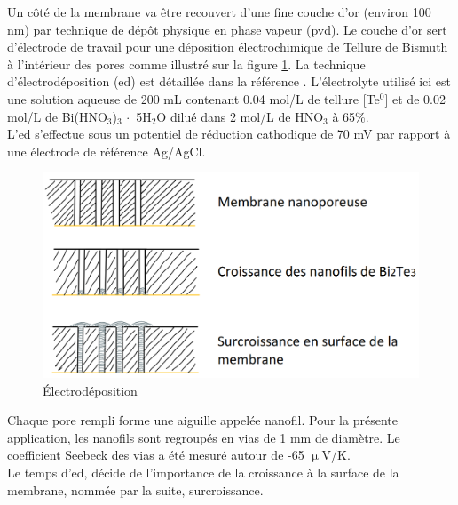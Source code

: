 Un côté de la membrane va être recouvert d'une fine couche d'or (environ 100 nm) par technique de dépôt physique en phase vapeur (\gls{pvd}). 
Le couche d'or sert d'électrode de travail pour une déposition électrochimique de Tellure de Bismuth à l'intérieur des pores comme illustré sur 
la figure \ref{fig:electrodeposition}. La technique d'électrodéposition (\gls{ed}) est détaillée dans la référence \cite{gravier_low-cost_2021}. 
L'électrolyte utilisé ici est une solution aqueuse de 200 mL contenant 0.04 mol/L de tellure [Te$^0$] et de 0.02 mol/L de 
Bi(HNO$_3$)$_3\,\cdot$ 5H$_2$O dilué dans 2 mol/L de HNO$_3$ à 65\%. \\
L'\gls{ed} s'effectue sous un potentiel de réduction cathodique de 70 mV par rapport à une électrode de référence Ag/AgCl. 

\begin{figure}[H]
    \centering
    \includegraphics[scale = 0.4]{images/Electrodeposition.png}
    \caption{Électrodéposition}
    \label{fig:electrodeposition}
\end{figure}

Chaque pore rempli forme une aiguille appelée nanofil. Pour la présente application, les nanofils sont regroupés en vias de 1 mm de 
diamètre. Le coefficient Seebeck des vias a été mesuré autour de -65 $\upmu$V/K. \\
Le temps d'\gls{ed}, décide de l'importance de la croissance à la surface de la membrane, nommée par la suite, surcroissance. 

